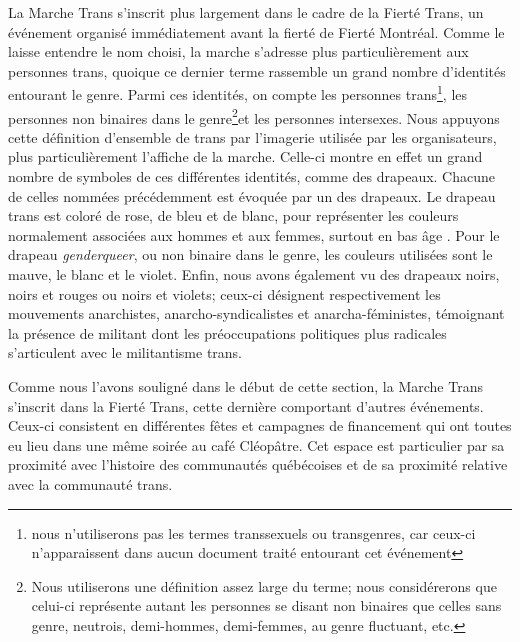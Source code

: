 La Marche Trans s'inscrit plus largement dans le cadre de la Fierté Trans, un événement organisé immédiatement avant la fierté de Fierté Montréal.
Comme le laisse entendre le nom choisi, la marche s'adresse plus particulièrement aux personnes trans, quoique ce dernier terme rassemble un grand nombre d'identités entourant le genre.
Parmi ces identités, on compte les personnes trans\footnote{nous n'utiliserons pas les termes transsexuels ou transgenres, car ceux-ci n'apparaissent dans aucun document traité entourant cet événement}, les personnes non binaires dans le genre\footnote{Nous utiliserons une définition assez large du terme; nous considérerons que celui-ci représente autant les personnes se disant non binaires que celles sans genre, neutrois, demi-hommes, demi-femmes, au genre fluctuant, etc.\citep[see][]{Barker2015}}et les personnes intersexes.
Nous appuyons cette définition d'ensemble de trans par l'imagerie utilisée par les organisateurs, plus particulièrement l'affiche de la marche.
Celle-ci montre en effet un grand nombre de symboles de ces différentes identités, comme des drapeaux.
Chacune de celles nommées précédemment est évoquée par un des drapeaux.
Le drapeau trans est coloré de rose, de bleu et de blanc, pour représenter les couleurs normalement associées aux hommes et aux femmes, surtout en bas âge \citep[quoique, selon les biens de consommation, ces couleurs sont souvent utilisées, surtout pour les produits féminins; voir][]{Koller2008}.
Pour le drapeau \emph{genderqueer}, ou non binaire dans le genre, les couleurs utilisées sont le mauve, le blanc et le violet.
Enfin, nous avons également vu des drapeaux noirs, noirs et rouges ou noirs et violets; ceux-ci désignent respectivement les mouvements anarchistes, anarcho-syndicalistes et anarcha-féministes, témoignant la présence de militant dont les préoccupations politiques plus radicales s'articulent avec le militantisme trans.

Comme nous l'avons souligné dans le début de cette section, la Marche Trans s'inscrit dans la Fierté Trans, cette dernière comportant d'autres événements.
Ceux-ci consistent en différentes fêtes et campagnes de financement qui ont toutes eu lieu dans une même soirée au café Cléopâtre.
Cet espace est particulier par sa proximité avec l'histoire des communautés \lgbt{} québécoises et de sa proximité relative avec la communauté trans.

